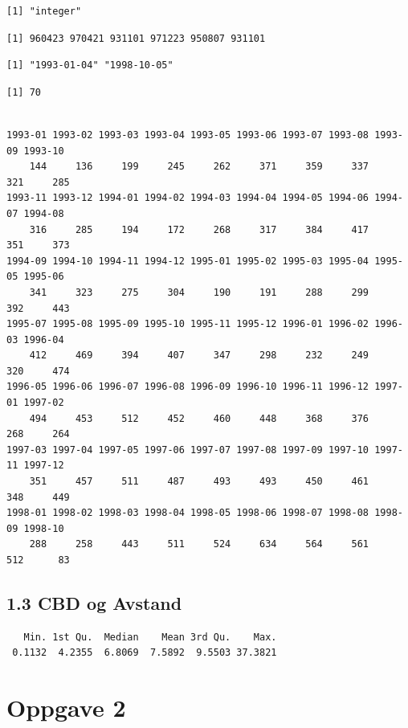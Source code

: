 \documentclass[
  norsk,
  a4paper,
]{article}
\begin{document}
\begin{verbatim}
[1] "integer"
\end{verbatim}

\begin{verbatim}
[1] 960423 970421 931101 971223 950807 931101
\end{verbatim}

\begin{verbatim}
[1] "1993-01-04" "1998-10-05"
\end{verbatim}

\begin{verbatim}
[1] 70
\end{verbatim}

\begin{verbatim}

1993-01 1993-02 1993-03 1993-04 1993-05 1993-06 1993-07 1993-08 1993-09 1993-10 
    144     136     199     245     262     371     359     337     321     285 
1993-11 1993-12 1994-01 1994-02 1994-03 1994-04 1994-05 1994-06 1994-07 1994-08 
    316     285     194     172     268     317     384     417     351     373 
1994-09 1994-10 1994-11 1994-12 1995-01 1995-02 1995-03 1995-04 1995-05 1995-06 
    341     323     275     304     190     191     288     299     392     443 
1995-07 1995-08 1995-09 1995-10 1995-11 1995-12 1996-01 1996-02 1996-03 1996-04 
    412     469     394     407     347     298     232     249     320     474 
1996-05 1996-06 1996-07 1996-08 1996-09 1996-10 1996-11 1996-12 1997-01 1997-02 
    494     453     512     452     460     448     368     376     268     264 
1997-03 1997-04 1997-05 1997-06 1997-07 1997-08 1997-09 1997-10 1997-11 1997-12 
    351     457     511     487     493     493     450     461     348     449 
1998-01 1998-02 1998-03 1998-04 1998-05 1998-06 1998-07 1998-08 1998-09 1998-10 
    288     258     443     511     524     634     564     561     512      83 
\end{verbatim}

\subsection{1.3 CBD og Avstand}\label{cbd-og-avstand}

\begin{verbatim}
   Min. 1st Qu.  Median    Mean 3rd Qu.    Max. 
 0.1132  4.2355  6.8069  7.5892  9.5503 37.3821 
\end{verbatim}

\section{Oppgave 2}\label{oppgave-2}
\end{document}
